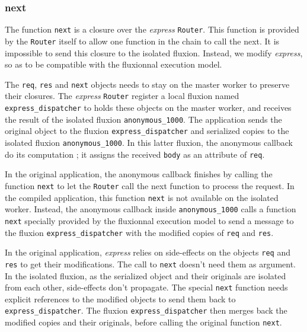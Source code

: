 \subsubsection{next}

The function \texttt{next} is a closure over the \textit{express} \texttt{Router}.
This function is provided by the \texttt{Router} itself to allow one function in the chain to call the next.
It is impossible to send this closure to the isolated fluxion.
Instead, we modify \textit{express}, so as to be compatible with the fluxionnal execution model.

The \texttt{req}, \texttt{res} and \texttt{next} objects needs to stay on the master worker to preserve their closures.
The \textit{express} \texttt{Router} register a local fluxion named \texttt{express\_dispatcher} to holds these objects on the master worker, and receives the result of the isolated fluxion \texttt{anonymous\_1000}.
The application sends the original object to the fluxion \texttt{express\_dispatcher} and serialized copies to the isolated fluxion \texttt{anonymous\_1000}.
In this latter fluxion, the anonymous callback do its computation ; it assigns the received \texttt{body} as an attribute of \texttt{req}.

In the original application, the anonymous callback finishes by calling the function \texttt{next} to let the \texttt{Router} call the next function to process the request.
In the compiled application, this function \texttt{next} is not available on the isolated worker.
Instead, the anonymous callback inside \texttt{anonymous\-\_1000} calls a function \texttt{next} specially provided by the fluxionnal execution model to send a message to the fluxion \texttt{express\-\_dispatcher} with the modified copies of \texttt{req} and \texttt{res}.

In the original application, \textit{express} relies on side-effects on the objects \texttt{req} and \texttt{res} to get their modifications.
The call to \texttt{next} doesn't need them as argument.
In the isolated fluxion, as the serialized object and their originals are isolated from each other, side-effects don't propagate.
The special \texttt{next} function needs explicit references to the modified objects to send them back to \texttt{express\_dispatcher}.
The fluxion \texttt{express\_dispatcher} then merges back the modified copies and their originals, before calling the original function \texttt{next}.

